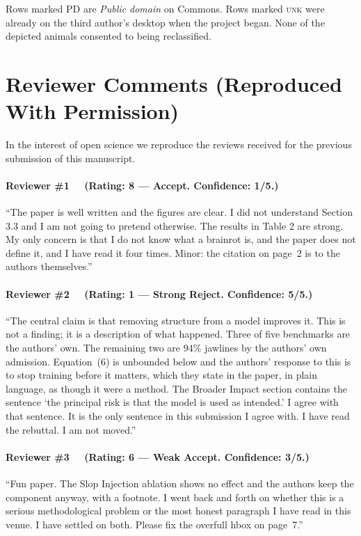 \documentclass[10pt]{article}
\begin{document}
\noindent Rows marked PD are \emph{Public domain} on Commons. Rows marked
\textsc{unk} were already on the third author's desktop when the project began.
None of the depicted animals consented to being reclassified.

\section{Reviewer Comments (Reproduced With Permission)}
\label{app:reviews}

In the interest of open science we reproduce the reviews received for the
previous submission of this manuscript.

\paragraph{Reviewer \#1 \ \ (Rating: 8 --- Accept. Confidence: 1/5.)}
``The paper is well written and the figures are clear. I did not understand
Section 3.3 and I am not going to pretend otherwise. The results in Table 2 are
strong. My only concern is that I do not know what a brainrot is, and the paper
does not define it, and I have read it four times. Minor: the citation on
page~2 is to the authors themselves.''

\paragraph{Reviewer \#2 \ \ (Rating: 1 --- Strong Reject. Confidence: 5/5.)}
``The central claim is that removing structure from a model improves it. This
is not a finding; it is a description of what happened. Three of five benchmarks
are the authors' own. The remaining two are $94\%$ jawlines by the authors' own
admission. Equation~(6) is unbounded below and the authors' response to this is
to stop training before it matters, which they state in the paper, in plain
language, as though it were a method. The Broader Impact section contains the
sentence `the principal risk is that the model is used as intended.' I agree
with that sentence. It is the only sentence in this submission I agree with.
I have read the rebuttal. I am not moved.''

\paragraph{Reviewer \#3 \ \ (Rating: 6 --- Weak Accept. Confidence: 3/5.)}
``Fun paper. The Slop Injection ablation shows no effect and the authors keep
the component anyway, with a footnote. I went back and forth on whether this
is a serious methodological problem or the most honest paragraph I have read in
this venue. I have settled on both. Please fix the overfull hbox on page~7.''
\end{document}
